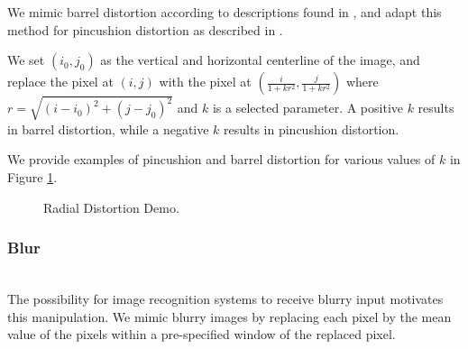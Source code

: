 \documentclass[pageno]{cos429}
\begin{document}
We mimic barrel distortion according to descriptions found in \cite{gribbon_real-time_2003}, and adapt this method for pincushion distortion as described in \cite{drap_exact_2016}.

We set $(i_0,j_0)$ as the vertical and horizontal centerline of the image, and replace the pixel at $(i,j)$ with the pixel at $(\frac{i}{1+kr^2},\frac{j}{1+kr^2})$ where $r=\sqrt{(i-i_0)^2+(j-j_0)^2}$ and $k$ is a selected parameter. A positive $k$ results in barrel distortion, while a negative $k$ results in pincushion distortion.

We provide examples of pincushion and barrel distortion for various values of $k$ in Figure \ref{fig:manipulationdemo_radial}.

\begin{figure}[!htb]
\caption{Radial Distortion Demo.}
\label{fig:manipulationdemo_radial}
\end{figure}

\subsubsection{Blur}\hspace*{\fill} \\
The possibility for image recognition systems to receive blurry input motivates this manipulation. We mimic blurry images by replacing each pixel by the mean value of the pixels within a pre-specified window of the replaced pixel.
\end{document}
